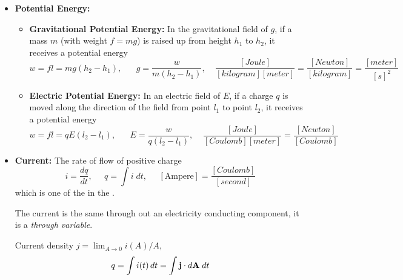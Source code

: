\documentclass{article}
\begin{document}
\begin{itemize}
\item {\bf Potential Energy:} 

  \begin{itemize}
  \item {\bf Gravitational Potential Energy:} In the gravitational field 
    of $g$, if a mass $m$ (with weight $f=mg$) is raised up from height 
    $h_1$ to $h_2$, it receives a potential energy
    \begin{equation}
      w=fl=mg(h_2-h_1),\;\;\;\;\;\;g=\frac{w}{m(h_2-h_1)},\;\;\;\;
      \frac{[Joule]}{[kilogram][meter]}=\frac{[Newton]}{[kilogram]}
      =\frac{[meter]}{[s]^2}
    \end{equation}

  \item {\bf Electric Potential Energy:} In an electric field of $E$, if 
    a charge $q$ is moved along the direction of the field from point $l_1$
    to point $l_2$, it receives a potential energy 
    \begin{equation}
      w=fl=qE(l_2-l_1),\;\;\;\;\;\;E=\frac{w}{q(l_2-l_1)},\;\;\;\;
      \frac{[Joule]}{[Coulomb][meter]}=\frac{[Newton]}{[Coulomb]}
    \end{equation}
  \end{itemize}

\item {\bf Current:} The rate of flow of positive charge 
  \begin{equation} 
    i=\frac{dq}{dt},\;\;\;\;\; q=\int i \; dt,	\;\;\;\;\;
    [\mbox{Ampere}]=\frac{[Coulomb]}{[second]}	
  \end{equation}
  which is one of the
  in the .

  The current is the same through out an electricity conducting component,
  it is a {\em through variable}.

  Current density $j=\lim_{A\rightarrow 0} i(A)/A$, 
  \begin{equation}
    q=\int i(t) \,dt =\int {\bf j} \cdot d{\bf A}\; dt
  \end{equation}


\end{itemize}
\end{document}
